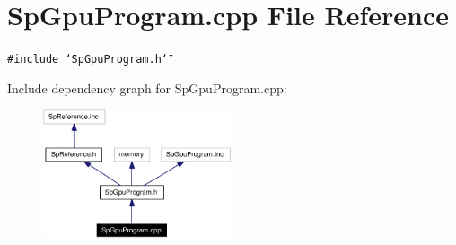 \section{Sp\-Gpu\-Program.cpp File Reference}
\label{SpGpuProgram_8cpp}
{\tt \#include \char`\"{}Sp\-Gpu\-Program.h\char`\"{}}\par


Include dependency graph for Sp\-Gpu\-Program.cpp:\begin{figure}[H]
\begin{center}
\leavevmode
\includegraphics[width=157pt]{SpGpuProgram_8cpp__incl}
\end{center}
\end{figure}
